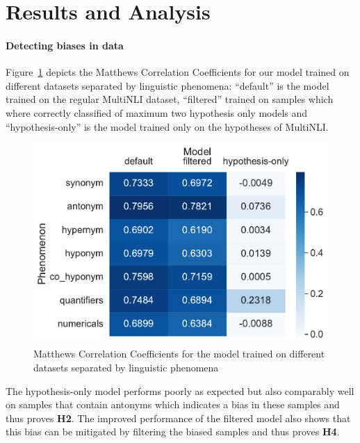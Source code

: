 \section{Results and Analysis} \label{sec:results}

\paragraph{Detecting biases in data}
Figure~\ref{fig:metric-heatmap-phenomena-mcc} depicts the Matthews Correlation Coefficients for our model trained on different datasets separated by linguistic phenomena: \enquote{default} is the model trained on the regular \ac{MultiNLI} dataset, \enquote{filtered} trained on samples which where correctly classified of maximum two hypothesis only models and \enquote{hypothesis-only} is the model trained only on the hypotheses of \ac{MultiNLI}.

\begin{figure}[ht]
    \centering
    \includegraphics[width=0.9\columnwidth]{./images/metric_heatmaps_phenomena/important_words/matthews_correlation.pdf}
    \caption{Matthews Correlation Coefficients for the model trained on different datasets separated by linguistic phenomena}
    \label{fig:metric-heatmap-phenomena-mcc}
\end{figure}

The hypothesis-only model performs poorly as expected but also comparably well on samples that contain antonyms which indicates a bias in these samples and thus proves \textbf{H2}. The improved performance of the filtered model also shows that this bias can be mitigated by filtering the biased samples and thus proves \textbf{H4}.

